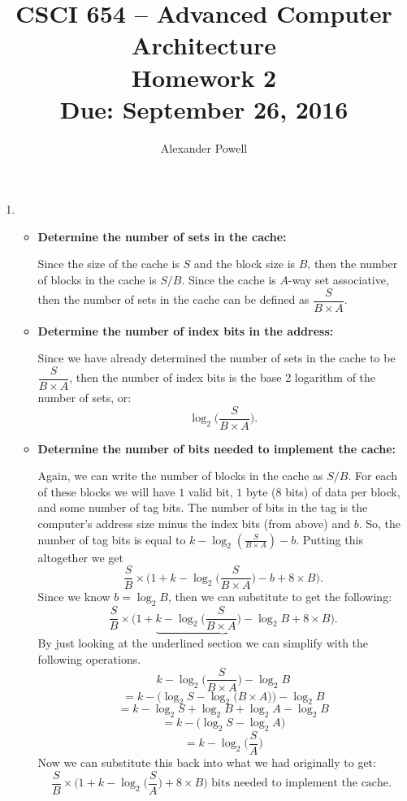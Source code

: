 \documentclass[10pt]{article} %
\title{CSCI 654 -- Advanced Computer Architecture \\
Homework 2 \\
{\large{\bf Due: September 26, 2016}}}
\date{}
\author{Alexander Powell}
\begin{document}
\maketitle
\begin{enumerate}

\item %

\begin{itemize}
\item \textbf{Determine the number of sets in the cache: }

Since the size of the cache is $S$ and the block size is $B$, then the number of blocks in the cache is $S/B$.  Since the cache is $A$-way set associative, then the number of sets in the cache can be defined as $\dfrac{S}{B \times A}$.  

\item \textbf{Determine the number of index bits in the address: }

Since we have already determined the number of sets in the cache to be $\dfrac{S}{B \times A}$, then the number of index bits is the base 2 logarithm of the number of sets, or:
$$ \log_2{\bigg(\dfrac{S}{B \times A}\bigg)}. $$

\item \textbf{Determine the number of bits needed to implement the cache: }

Again, we can write the number of blocks in the cache as $S/B$.  For each of these blocks we will have $1$ valid bit, $1$ byte ($8$ bits) of data per block, and some number of tag bits.  The number of bits in the tag is the computer's address size minus the index bits (from above) and $b$.  So, the number of tag bits is equal to $k - \log_2{(\frac{S}{B \times A})} - b$.  Putting this altogether we get
$$ \dfrac{S}{B} \times \bigg( 1 + k - \log_2{\bigg(\dfrac{S}{B \times A}\bigg)} - b + 8 \times B \bigg). $$
Since we know $b = \log_2{B}$, then we can substitute to get the following:
$$ \dfrac{S}{B} \times \bigg( 1 + \underbrace{k - \log_2{\bigg(\dfrac{S}{B \times A}\bigg)} - \log_2{B}} + 8 \times B \bigg). $$
By just looking at the underlined section we can simplify with the following operations.  
$$ k - \log_2{\bigg(\dfrac{S}{B \times A}\bigg)} - \log_2{B} $$
$$ = k - \bigg(\log_2{S} - \log_2{\bigg(B \times A\bigg)} \bigg) - \log_2{B} $$
$$ = k - \log_2{S} + \log_2{B} + \log_2{A} - \log_2{B} $$
$$ = k - \bigg( \log_2{S} - \log_2{A} \bigg) $$
$$ = k - \log_2{\bigg(\dfrac{S}{A}\bigg)} $$
Now we can substitute this back into what we had originally to get:
$$ \frac{S}{B} \times \bigg( 1 + k - \log_2{\bigg(\frac{S}{A}\bigg)} + 8 \times B \bigg) \text{ bits needed to implement the cache. }$$


\end{itemize}
\end{enumerate}
\end{document}

